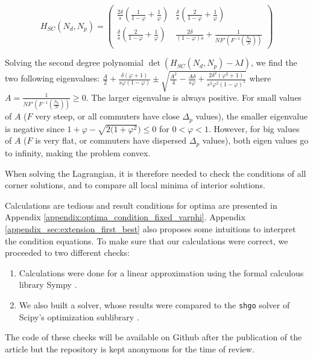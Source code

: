 \documentclass[english, a4paper]{article}
\theoremstyle{plain}
\theoremstyle{definition}
\theoremstyle{remark}
\begin{document}
\begin{equation*}
    H_{SC}(N_d, N_p) = \begin{pmatrix}
        \frac{2 \delta}{s} \left( \frac{1}{1 - \varphi} + \frac{1}{\varphi} \right) & \frac{\delta}{s} \left( \frac{2}{1 - \varphi} + \frac{1}{\varphi} \right)\\
        \frac{\delta}{s} \left( \frac{2}{1 - \varphi} + \frac{1}{\varphi} \right) & \frac{2\delta}{(1- \varphi )s} + \frac{1}{NF'\left(F^{-1}\left(\frac{N_p}{N} \right)\right)}
    \end{pmatrix}
\end{equation*}

Solving the second degree polynomial $\det (H_{SC}(N_d, N_p) - \lambda I)$, we find the two following eigenvalues: $\frac{A}{2} + \frac{\delta (\varphi + 1)}{s \varphi (1 - \varphi)} \pm \sqrt{\frac{A^2}{4} - \frac{A \delta}{s \varphi} + \frac{2 \delta^2 (\varphi^2 + 1)}{s^2 \varphi^2 (1 - \varphi)^2}}$ where $A = \frac{1}{NF'\left(F^{-1}\left( \frac{N_p}{N} \right) \right)} \geq 0$. The larger eigenvalue is always positive. For small values of $A$ ($F$ very steep, or all commuters have close $\Delta_p$ values), the smaller eigenvalue is negative since $1 + \varphi - \sqrt{2(1 + \varphi ^2}) \leq 0$ for $0 < \varphi < 1$. However, for big values of $A$ ($F$ is very flat, or commuters have dispersed $\Delta_p$ values), both eigen values go to infinity, making the problem convex.

When solving the Lagrangian, it is therefore needed to check the conditions of all corner solutions, and to compare all local minima of interior solutions.

Calculations are tedious and result conditions for optima are presented in Appendix \ref{appendix:optima_condition_fixed_varphi}. Appendix \ref{appendix_sec:extension_first_best} also proposes some intuitions to interpret the condition equations. To make sure that our calculations were correct, we proceeded to two different checks:
\begin{enumerate}
    \item Calculations were done for a linear approximation using the formal calculous library Sympy \parencite{meurer_sympy_2017}.
    \item We also built a solver, whose results were compared to the \texttt{shgo} solver of Scipy’s optimization sublibrary \parencite{virtanen_scipy_2020}.
\end{enumerate}
\alert{The code of these checks will be available on Github after the publication of the article but the repository is kept anonymous for the time of review}.
\end{document}
